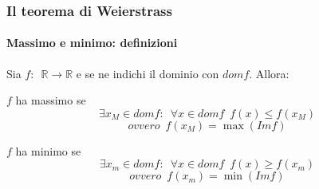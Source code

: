 \documentclass[10pt]{article}
\theoremstyle{plain}
\begin{document}
\subsubsection{Il teorema di Weierstrass}

\paragraph{Massimo e minimo: definizioni}
Sia $f : \enspace \mathbb{R} \longrightarrow \mathbb{R}$ e se ne indichi il dominio con $dom f$. Allora:
\begin{defin}
$f$ ha massimo se \[\exists x_M \in dom f : \enspace \forall x \in dom f \enspace f(x) \leq f(x_M)\]
\[ovvero \enspace f(x_M) = \max (Im f)\]
\end{defin}
\begin{defin}
$f$ ha minimo se \[\exists x_m \in dom f : \enspace \forall x \in dom f \enspace f(x) \geq f(x_m)\]
\[ovvero \enspace f(x_m) = \min (Im f)\]
\end{defin}
\end{document}
